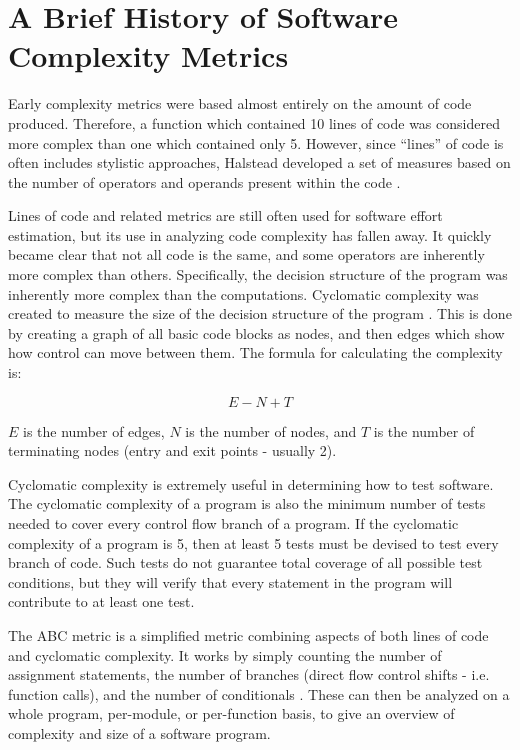 \section{A Brief History of Software Complexity Metrics}

Early complexity metrics were based almost entirely on the amount of code produced.  Therefore, a function which contained 10 lines of code was considered more complex than one which contained only 5.  However, since ``lines'' of code is often includes stylistic approaches, Halstead developed a set of measures based on the number of operators and operands present within the code \cite{kearney}.

Lines of code and related metrics are still often used for software effort estimation, but its use in analyzing code complexity has fallen away.  It quickly became clear that not all code is the same, and some operators are inherently more complex than others.  Specifically, the decision structure of the program was inherently more complex than the computations.  Cyclomatic complexity was created to measure the size of the decision structure of the program \cite{mccabe}.  This is done by creating a graph of all basic code blocks as nodes, and then edges which show how control can move between them.  The formula for calculating the complexity is:

$$E - N + T$$

$E$ is the number of edges, $N$ is the number of nodes, and $T$ is the number of terminating nodes (entry and exit points - usually 2).   

Cyclomatic complexity is extremely useful in determining how to test software.  The cyclomatic complexity of a program is also the minimum number of tests needed to cover every control flow branch of a program.  If the cyclomatic complexity of a program is 5, then at least 5 tests must be devised to test every branch of code.  Such tests do not guarantee total coverage of all possible test conditions, but they will verify that every statement in the program will contribute to at least one test.

The ABC metric is a simplified metric combining aspects of both lines of code and cyclomatic complexity.  It works by simply counting the number of assignment statements, the number of branches (direct flow control shifts - i.e. function calls), and the number of conditionals \cite[pg.~2--3]{fitzpatrick}.  These can then be analyzed on a whole program, per-module, or per-function basis, to give an overview of complexity and size of a software program.

